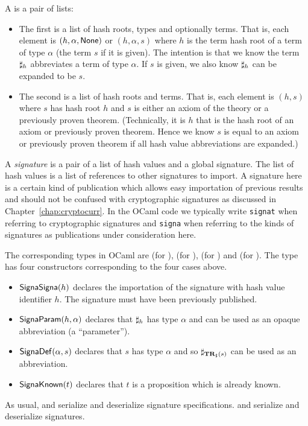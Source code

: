 A {} is a pair of lists:
\begin{itemize}
\item The first is a list of hash roots, types and optionally terms.
      That is, each element is $(h,\alpha,{\mbox{\val{None}}})$ or $(h,\alpha,s)$
      where $h$ is the term hash root of a term of type $\alpha$ (the term $s$ if it is given).
      The intention is that we know the term $\mathbf{\sharp}_{h}$ abbreviates a term of type $\alpha$.
      If $s$ is given, we also know $\mathbf{\sharp}_{h}$ can be expanded to be $s$.
\item The second is a list of hash roots and terms.
      That is, each element is $(h,s)$ where $s$ has hash root $h$
      and $s$ is either an axiom of the theory or a previously proven theorem.
      (Technically, it is $h$ that is the hash root of an axiom or previously proven theorem.
      Hence we know $s$ is equal to an axiom or previously proven theorem if all hash value
      abbreviations are expanded.)
\end{itemize}
A {\emph{signature}} is a pair of a list of hash values and a global signature.
The list of hash values is a list of references to other signatures to import.
A signature here is a certain kind of publication which allows
easy importation of previous results
and should not be confused with cryptographic signatures as discussed in Chapter~\ref{chap:cryptocurr}.
In the OCaml code we typically write {\tt{signat}} when referring to cryptographic signatures
and {\tt{signa}} when referring to the kinds of signatures as publications under consideration here.

The corresponding types in OCaml are
{} (for {}),
{} (for {}),
{} (for {}) and
{} (for {}).
The type {} has four constructors corresponding to the four cases above.
\begin{itemize}
\item $\mbox{\constr{SignaSigna}}(h)$ declares the importation of the signature with hash value identifier $h$.
The signature must have been previously published.
\item $\mbox{\constr{SignaParam}}(h,\alpha)$ declares that $\mathbf{\sharp}_{h}$ has type $\alpha$ and can be used
as an opaque abbreviation (a ``parameter'').
\item $\mbox{\constr{SignaDef}}(\alpha,s)$ declares that $s$ has type $\alpha$ and so $\mathbf{\sharp}_{\mathbf{TR}_{\sharp}(s)}$ can
be used as an abbreviation.
\item $\mbox{\constr{SignaKnown}}(t)$ declares that $t$ is a proposition which is already known.
\end{itemize}
As usual,
{} and {} serialize and deserialize signature specifications.
{} and {} serialize and deserialize signatures.

